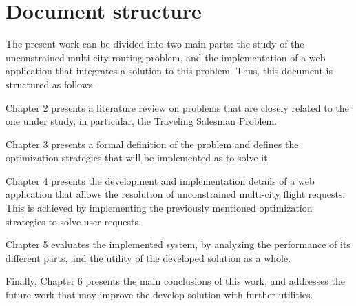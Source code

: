 \section{Document structure}

The present work can be divided into two main parts: the study of the unconstrained multi-city routing problem, and the implementation of a web application that integrates a solution to this problem. Thus, this document is structured as follows.

Chapter 2 presents a literature review on problems that are closely related to the one under study, in particular, the Traveling Salesman Problem.

Chapter 3 presents a formal definition of the problem and defines the optimization strategies that will be implemented as to solve it.

Chapter 4 presents the development and implementation details of a web application that allows the resolution of unconstrained multi-city flight requests. This is achieved by implementing the  previously mentioned optimization strategies to solve user requests.  

Chapter 5 evaluates the implemented system, by analyzing the performance of its different parts, and the utility of the developed solution as a whole.

Finally, Chapter 6 presents the main conclusions of this work, and addresses the future work that may improve the develop solution with further utilities.

